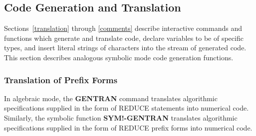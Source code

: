 \subsection{Code Generation and Translation}
Sections~\ref{translation} through \ref{comments}
describe interactive commands and functions which
generate and translate code, declare variables to be of 
specific types, and insert literal strings of characters into the
stream of generated code.  This section describes analogous symbolic
mode code generation functions.

\subsubsection{Translation of Prefix Forms}
In algebraic mode, the {\bf GENTRAN} command translates algorithmic
specifications supplied in the form of REDUCE statements into
numerical code.  Similarly, the symbolic function {\bf SYM!-GENTRAN}
translates algorithmic specifications supplied in the form of REDUCE
prefix forms into numerical code.

